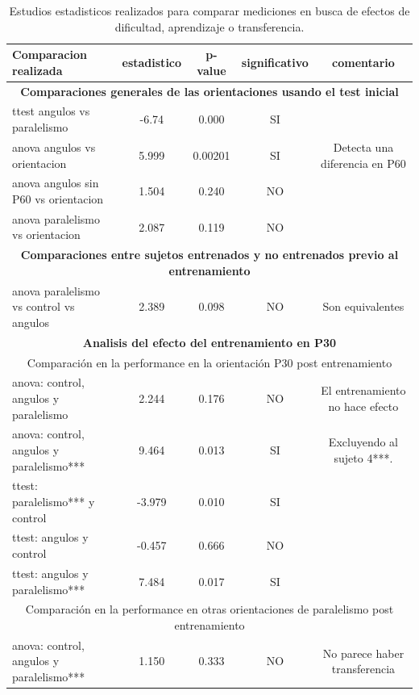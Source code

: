 \documentclass{article}
\begin{document}
\begin{table}
\begin{center}

\caption{Estudios estadisticos realizados para comparar mediciones en busca de efectos de dificultad, aprendizaje o transferencia.}
\label{tabla:significativos}

\vspace{0.3in}

\begin{tabular}{lcccc}
\textbf{Comparacion realizada} & estadistico & p-value & significativo & comentario\\
\midrule
\midrule
\multicolumn{5}{c}{ \textbf{Comparaciones generales de las orientaciones usando el test inicial}} \\
\midrule
ttest angulos vs paralelismo & -6.74 & 0.000 & SI \\
anova angulos vs orientacion & 5.999 & 0.00201 & SI & Detecta una diferencia en P60 \\
anova angulos sin P60 vs orientacion  & 1.504 &  0.240 & NO \\
anova paralelismo vs orientacion & 2.087 & 0.119 & NO\\
\midrule
\multicolumn{5}{c}{ \textbf{Comparaciones entre sujetos entrenados y no entrenados previo al entrenamiento}} \\
\midrule
anova paralelismo vs control vs angulos & 2.389 & 0.098 & NO & Son equivalentes\\
\midrule
\multicolumn{5}{c}{ \textbf{Analisis del efecto del entrenamiento en P30}} \\
\midrule

\midrule
\multicolumn{5}{c}{Comparación en la performance en la orientación P30 post entrenamiento} \\
\midrule
anova: control, angulos y paralelismo & 2.244 & 0.176 & NO & El entrenamiento no hace efecto \\
anova: control, angulos y paralelismo*** & 9.464 & 0.013 & SI & Excluyendo al sujeto 4***. \\
ttest: paralelismo*** y control & -3.979 & 0.010 & SI & \\
ttest: angulos y control & -0.457 & 0.666 & NO & \\
ttest: angulos y paralelismo*** & 7.484 & 0.017 & SI & \\

\midrule
\multicolumn{5}{c}{Comparación en la performance en otras orientaciones de paralelismo post entrenamiento} \\
\midrule
anova: control, angulos y paralelismo*** & 1.150 & 0.333 & NO & No parece haber transferencia\\


\end{tabular}
\end{center}
\end{table}
\end{document}
